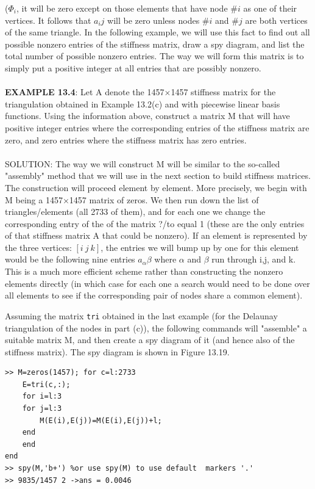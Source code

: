\documentclass[../main.tex]{subfiles}
\begin{document}
($\Phi_i$, it will be zero except on those elements that have node $\#i$ as one of their 
vertices. It follows that $a_ij$ will be zero unless nodes $\#i$ and $\#j$ are both vertices of 
the same triangle. In the following example, we will use this fact to find out all 
possible nonzero entries of the stiffness matrix, draw a spy diagram, and list the 
total number of possible nonzero entries. The way we will form this matrix is to 
simply put a positive integer at all entries that are possibly nonzero.
\\
\\
\textbf{EXAMPLE 13.4}: Let A denote the 1457$\times$1457 stiffness matrix for the 
triangulation obtained in Example 13.2(c) and with piecewise linear basis 
functions. Using the information above, construct a matrix M that will have 
positive integer entries where the corresponding entries of the stiffness matrix are 
zero, and zero entries where the stiffness matrix has zero entries.
\\
\\
SOLUTION: The way we will construct M will be similar to the so-called 
"assembly" method that we will use in the next section to build stiffness matrices. 
The construction will proceed element by element. More precisely, we begin with 
M being a 1457$\times$1457 matrix of zeros. We then run down the list of 
triangles/elements (all 2733 of them), and for each one we change the 
corresponding entry of the of the matrix ?/to equal 1 (these are the only entries of 
that stiffness matrix A that could be nonzero). If an element is represented by the 
three vertices: $\left[ i ~j ~ k \right]$, the entries we will bump up by one for this element would be the following nine entries $a_\alpha\beta$ where $\alpha$ and $\beta$ run through i,j, and k. This is a much more efficient scheme rather than constructing the nonzero elements directly (in which case for each one a search would need to be done over all elements to see if the corresponding pair of nodes share a common element).

Assuming the matrix \texttt{tri} obtained in the last example (for the Delaunay 
triangulation of the nodes in part (c)), the following commands will "assemble" a 
suitable matrix M, and then create a spy diagram of it (and hence also of the 
stiffness matrix). The spy diagram is shown in Figure 13.19. 
\begin{lstlisting}[numbers=none,frame=none]
>> M=zeros(1457); for c=l:2733 
	E=tri(c,:); 
	for i=l:3 
	for j=l:3 
		M(E(i),E(j))=M(E(i),E(j))+l; 
	end 
	end 
end 
>> spy(M,'b+') %or use spy(M) to use default  markers '.'
>> 9835/1457 2 ->ans = 0.0046 
\end{lstlisting}
\end{document}
